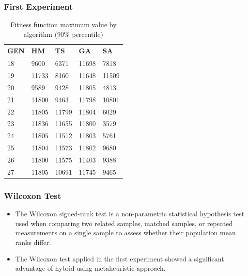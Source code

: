 \documentclass{beamer}
\begin{document}
\begin{frame}[allowframebreaks]
\frametitle{First Experiment}
\begin{table}[h]
\centering
\caption{Fitness function maximum value by algorithm (90\% percentile)}
\label{tab:averagefirst}
\begin{tabular}{|l|l|l|l|l|}
\hline
GEN & HM & TS  & GA    & SA    \\ \hline
18         & 9600  & 6371          & 11698 & 7818  \\ \hline
19         & 11733 & 8160          & 11648 & 11509 \\ \hline
20         & 9589  & 9428          & 11805 & 4813  \\ \hline
21         & 11800 & 9463          & 11798 & 10801 \\ \hline
22         & 11805 & 11799         & 11804 & 6029  \\ \hline
23         & 11836 & 11655         & 11800 & 3579  \\ \hline
24         & 11805 & 11512         & 11803 & 5761  \\ \hline
25         & 11804 & 11573         & 11802 & 9680  \\ \hline
26         & 11800 & 11575         & 11403 & 9388  \\ \hline
27         & 11805 & 10691         & 11745 & 9465  \\ \hline
\end{tabular}
\end{table}
\end{frame}


\begin{frame}
\frametitle{Wilcoxon Test}

\begin{itemize}
\item The Wilcoxon signed-rank test is a non-parametric statistical hypothesis test used when comparing two related samples, matched samples, or repeated measurements on a single sample to assess whether their population mean ranks differ.

\item The Wilcoxon test applied in the first experiment showed a significant advantage of hybrid using metaheuristic approach.
\end{itemize}

\end{frame}
\end{document}
